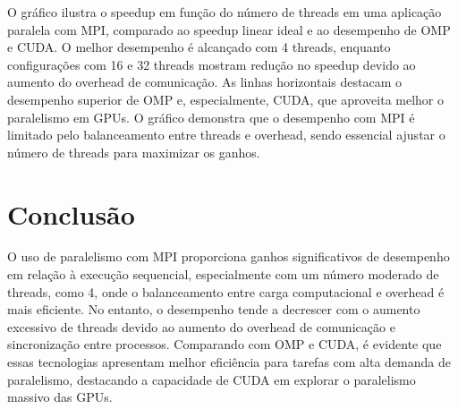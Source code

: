 \documentclass[12pt]{article}
\begin{document}
O gráfico ilustra o speedup em função do número de threads em uma aplicação paralela com MPI, comparado ao speedup linear ideal e ao desempenho de OMP e CUDA. O melhor desempenho é alcançado com 4 threads, enquanto configurações com 16 e 32 threads mostram redução no speedup devido ao aumento do overhead de comunicação. As linhas horizontais destacam o desempenho superior de OMP e, especialmente, CUDA, que aproveita melhor o paralelismo em GPUs. O gráfico demonstra que o desempenho com MPI é limitado pelo balanceamento entre threads e overhead, sendo essencial ajustar o número de threads para maximizar os ganhos.

\section{Conclusão}
O uso de paralelismo com MPI proporciona ganhos significativos de desempenho em relação à execução sequencial, especialmente com um número moderado de threads, como 4, onde o balanceamento entre carga computacional e overhead é mais eficiente. No entanto, o desempenho tende a decrescer com o aumento excessivo de threads devido ao aumento do overhead de comunicação e sincronização entre processos. Comparando com OMP e CUDA, é evidente que essas tecnologias apresentam melhor eficiência para tarefas com alta demanda de paralelismo, destacando a capacidade de CUDA em explorar o paralelismo massivo das GPUs. 




\nocite{*}
\end{document}
